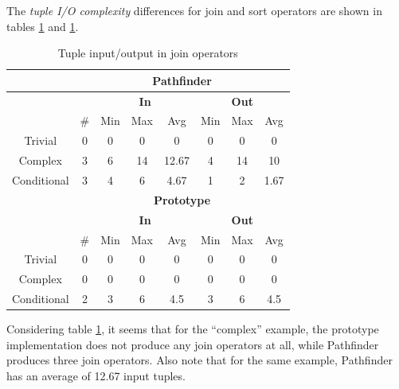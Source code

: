 \newpage
The \textit{tuple I/O complexity} differences for \textsf{join}
and \textsf{sort} operators are shown in tables
\ref{table:result:complexity_matrix_tio_1} and
\ref{table:result:complexity_matrix_tio_1}.

\begin{table}[!htp]
 \begin{center}
 \begin{tabular}{| c | c | c | c | c | c | c | c |}
  \hline
   & \multicolumn{7}{|c|}{\textbf{Pathfinder}} \\
   \hline
   &  & \multicolumn{3}{|c|}{\textbf{In}} &
   \multicolumn{3}{|c|}{\textbf{Out}}  \\
   \hline
   &  \# & Min & Max & Avg & Min & Max & Avg\\
   \hline
   Trivial & 0 & 0 & 0 & 0 & 0 & 0 & 0  \\
   \hline
   Complex & 3 & 6 & 14 & 12.67 & 4 & 14 & 10  \\
   \hline
   Conditional & 3 & 4 & 6 & 4.67 & 1 & 2 & 1.67  \\
   \hline
   & \multicolumn{7}{|c|}{\textbf{Prototype}} \\
   \hline
   &  & \multicolumn{3}{|c|}{\textbf{In}} & 
   \multicolumn{3}{|c|}{\textbf{Out}} \\
   \hline
   & \# & Min & Max & Avg & Min & Max & Avg \\ 
   \hline 
   Trivial & 0 & 0 & 0 & 0 & 0 & 0 & 0 \\
   \hline
   Complex & 0 & 0 & 0 & 0 & 0 & 0 & 0 \\
   \hline
   Conditional & 2 & 3 & 6 & 4.5 & 3 & 6 & 4.5 \\
   \hline
 \end{tabular}
\caption{Tuple input/output in join operators}
\label{table:result:complexity_matrix_tio_1}
 \end{center}
\end{table}

Considering table \ref{table:result:complexity_matrix_tio_1}, it seems that for
the ``complex'' example, the prototype implementation does not produce any
join operators at all, while Pathfinder produces three join operators. Also
note that for the same example, Pathfinder has an average of 12.67 input tuples.

